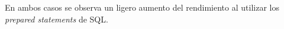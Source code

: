 \documentclass{article}
\begin{document}
\begin{multicols}{4}
    \begin{center}
    \end{center}
    \columnbreak
    \begin{center}
    \end{center}
    \columnbreak
    \begin{center}
    \end{center}
    \columnbreak
    \begin{center}
    \end{center}
\end{multicols}
En ambos casos se observa un ligero aumento del rendimiento al utilizar los \textit{prepared statements} de SQL.
\newpage
\end{document}
